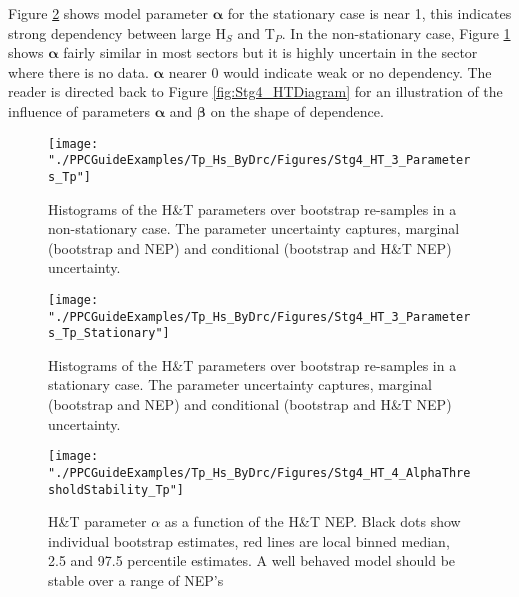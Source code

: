 Figure \ref{fig:Stg4_HT_3_Parameters} shows model parameter $\boldsymbol{\alpha}$ for the stationary case is near 1, this indicates strong dependency between large H$_S$ and T$_P$. In the non-stationary case, Figure \ref{fig:Stg4_HT_3_ParametersNonStat} shows $\boldsymbol{\alpha}$ fairly similar in most sectors but it is highly uncertain in the sector where there is no data. $\boldsymbol{\alpha}$ nearer 0 would indicate weak or no dependency. The reader is directed back to Figure \ref{fig:Stg4_HTDiagram} for an illustration of the influence of parameters $\boldsymbol{\alpha}$ and $\boldsymbol{\beta}$ on the shape of dependence.

\begin{figure}
	\centering
	\texttt{[image: "./PPCGuideExamples/Tp\_Hs\_ByDrc/Figures/Stg4\_HT\_3\_Parameters\_Tp"]}
	\caption{Histograms of the H\&T parameters over bootstrap re-samples in a non-stationary case. The parameter uncertainty captures, marginal (bootstrap and NEP) and conditional (bootstrap and H\&T NEP) uncertainty.  }
	\label{fig:Stg4_HT_3_ParametersNonStat}
\end{figure}

\begin{figure}
	\centering
	\texttt{[image: "./PPCGuideExamples/Tp\_Hs\_ByDrc/Figures/Stg4\_HT\_3\_Parameters\_Tp\_Stationary"]}
	\caption{Histograms of the H\&T parameters over bootstrap re-samples in a stationary case. The parameter uncertainty captures, marginal (bootstrap and NEP) and conditional (bootstrap and H\&T NEP) uncertainty.  }
	\label{fig:Stg4_HT_3_Parameters}
\end{figure}

\vspace{10pt}
\noindent{}
\vspace{10pt}

\begin{figure}
	\centering
	\texttt{[image: "./PPCGuideExamples/Tp\_Hs\_ByDrc/Figures/Stg4\_HT\_4\_AlphaThresholdStability\_Tp"]}
	\caption{H\&T parameter $\alpha$  as a function of the H\&T NEP. Black dots show individual bootstrap estimates, red lines are local binned median, 2.5 and 97.5 percentile estimates. A well behaved model should be stable over a range of NEP's }
	\label{fig:Stg4_HT_4_AlphaThresholdStability}
\end{figure}

